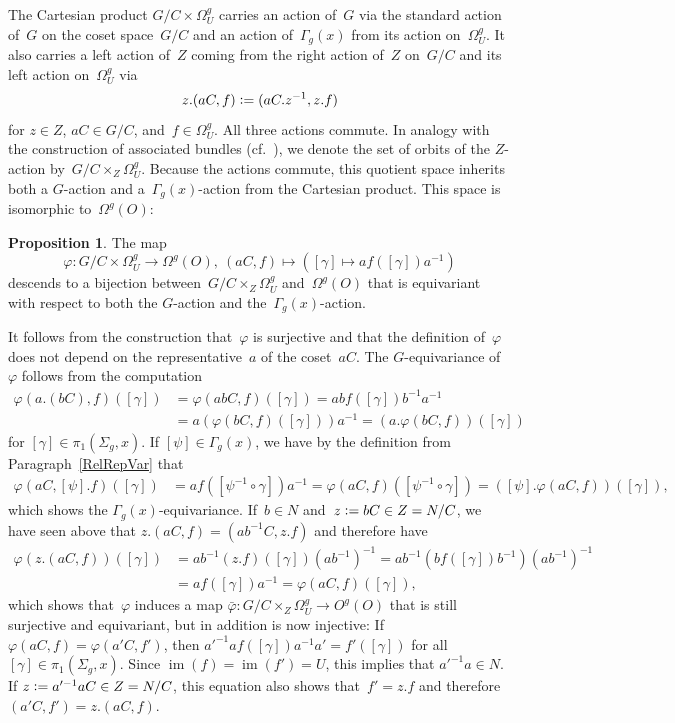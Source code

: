 \documentclass[12pt]{article}
\makeatletter
\theoremstyle{definition}
\newtheorem{Proposition}[Satz]{Proposition}
\theoremstyle{break}
\renewenvironment{proof}[1][\proofname]{\par
\vspace{-5pt}%
\pushQED{\qed}%
\normalfont
\topsep0pt \partopsep0pt %
\trivlist
\item[\hskip\labelsep
\bfseries
#1\@addpunct{.}]\ignorespaces
}{%
\popQED\endtrivlist\@endpefalse
\addvspace{6pt plus 6pt} %
}
\DeclareMathOperator\im{im}
\renewcommand{\1}{\mathbbm{1}}
\newcommand{\deq}{\vcentcolon =}
\makeatother
\begin{document}
The Cartesian product $G/C \times \Omega_U^{g}$ carries an action of~$G$ via the standard action of~$G$ on the coset space~$G/C$ and an action of~$\Gamma_{g}(x)$ from its action
on~$\Omega_U^{g}$. It also carries a left action of~$Z$ coming from the right action of~$Z$ on~$G/C$ and its left action on~$\Omega_U^{g}$ via
\[z.(aC, f) \deq (aC.z^{-1}, z.f)\]
for $z \in Z$, $aC \in G/C$, and~$f \in \Omega_U^{g}$. All three actions commute. In analogy with the construction of associated bundles (cf.~\cite[Sec.~I-5, p.~54f]{KN}), we denote the set of orbits of the $Z$-action by~$G/C \times_Z \Omega_U^{g}$. Because the actions commute, this quotient space inherits both a $G$-action and a~$\Gamma_{g}(x)$-action from the Cartesian product. This space is isomorphic to~$\Omega^g(O)$:
\begin{Proposition} \label{PropDecomp}
The map
\[\varphi \colon G/C \times \Omega_U^{g} \to \Omega^g(O),~(aC,f) \mapsto
([\gamma] \mapsto af([\gamma])a^{-1})\]
descends to a bijection between~$G/C \times_Z \Omega_U^{g}$ and~$\Omega^g(O)$ that is equivariant with respect to both the $G$-action and the~$\Gamma_{g}(x)$-action.
\end{Proposition}
\begin{proof}
It follows from the construction that~$\varphi$ is surjective and that the definition of~$\varphi$ does not depend on the representative~$a$ of the coset~$aC$. The $G$-equivariance of~$\varphi$ follows from the computation
\begin{align*}
\varphi(a.(bC),f)([\gamma]) &= \varphi(abC,f)([\gamma]) = ab f([\gamma]) b^{-1}a^{-1} \\
&= a (\varphi(bC,f)([\gamma])) a^{-1} = (a.\varphi(bC,f))([\gamma])
\end{align*}
for $[\gamma] \in \pi_1(\Sigma_g,x)$. If $[\psi] \in \Gamma_{g}(x)$, we have by the definition from Paragraph~\ref{RelRepVar} that
\begin{align*}
\varphi(aC, [\psi].f)([\gamma]) &= a f([\psi^{-1} \circ \gamma]) a^{-1}
= \varphi(aC,f)([\psi^{-1} \circ \gamma])
= ([\psi].\varphi(aC,f))([\gamma]),
\end{align*}
which shows the $\Gamma_{g}(x)$-equivariance. If~$b \in N$ and~$z \deq bC \in Z = N/C$, we have seen above that $z.(aC, f) = (ab^{-1}C, z.f)$ and therefore have
\begin{align*}
\varphi(z.(aC, f))([\gamma]) &= ab^{-1} (z.f)([\gamma]) (ab^{-1})^{-1}
= ab^{-1} (b f([\gamma]) b^{-1}) (ab^{-1})^{-1} \\
&= a f([\gamma]) a^{-1} = \varphi(aC, f)([\gamma]),
\end{align*}
which shows that~$\varphi$ induces a map
$\bar{\varphi}\colon G/C \times_Z \Omega_U^{g}\to O^g(O)$ that is still surjective and equivariant, but in addition is now injective: If $\varphi(a C,f) = \varphi(a' C,f')$,
then $a'^{-1} a f([\gamma]) a^{-1} a' = f'([\gamma])$ for all $[\gamma]\in \pi_1(\Sigma_g,x)$. Since
$\im(f) = \im(f') = U$, this implies that $a'^{-1} a \in N$.
If $z \deq a'^{-1} a C \in Z = N/C$, this equation also shows that~$f' = z.f$ and therefore
$(a' C,f') = z.(a C,f)$.
\end{proof}
\end{document}
